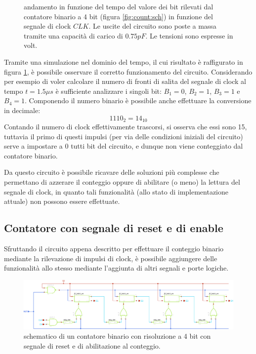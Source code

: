 	\begin{figure}[bht]
		\centering
		
		\vspace{3mm}
		\caption{andamento in funzione del tempo del valore dei bit rilevati dal contatore binario a 4 bit (figura \ref{fig:count:sch}) in funzione del segnale di clock $CLK$. Le uscite del circuito sono poste a massa tramite una capacità di carico di $0.75pF$. Le tensioni sono espresse in volt.}
		\label{fig:count:mult}
	\end{figure}
	
	Tramite una simulazione nel dominio del tempo, il cui risultato è raffigurato in figura \ref{fig:count:mult}, è possibile osservare il corretto funzionamento del circuito. Considerando per esempio di voler calcolare il numero di fronti di salita del segnale di clock al tempo $t=1.5\mu s$ è sufficiente analizzare i singoli bit: $B_1 = 0$, $B_2 = 1$, $B_3=1$ e $B_4=1$. Componendo il numero binario è possibile anche effettuare la conversione in decimale:
	\[ 1110_2 = 14_{10} \]
	Contando il numero di clock effettivamente trascorsi, si osserva che essi sono 15, tuttavia il primo di questi impulsi (per via delle condizioni iniziali del circuito) serve a impostare a 0 tutti bit del circuito, e dunque non viene conteggiato dal contatore binario.
	
	Da questo circuito è possibile ricavare delle soluzioni più complesse che permettano di azzerare il conteggio oppure di abilitare (o meno) la lettura del segnale di clock, in quanto tali funzionalità (allo stato di implementazione attuale) non possono essere effettuate.
	
\subsection*{Contatore con segnale di reset e di enable}
	
	Sfruttando il circuito appena descritto per effettuare il conteggio binario mediante la rilevazione di impulsi di clock, è possibile aggiungere delle funzionalità allo stesso mediante l'aggiunta di altri segnali e porte logiche. 
	
	\begin{figure}[bht]
		\centering
		\includegraphics[width=\linewidth]{Immagini/count2-sch}
		\caption{schematico di un contatore binario con risoluzione a 4 bit con segnale di reset e di abilitazione al conteggio.}
		\label{fig:count:resen}
	\end{figure}
	
